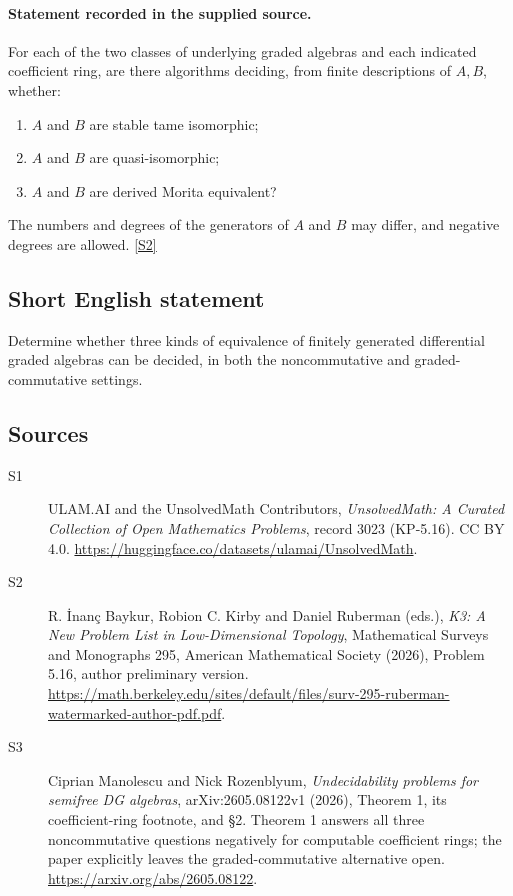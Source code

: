\documentclass[11pt]{article}
\newcommand{\sref}[2]{\hyperlink{source:#1:#2}{[S#2]}}
\begin{document}
\paragraph{Statement recorded in the supplied source.}
For each of the two classes of underlying graded algebras and each indicated coefficient ring, are there algorithms deciding, from finite descriptions of $A,B$, whether:
\begin{enumerate}
\item[(a)] $A$ and $B$ are stable tame isomorphic;
\item[(b)] $A$ and $B$ are quasi-isomorphic;
\item[(c)] $A$ and $B$ are derived Morita equivalent?
\end{enumerate}
The numbers and degrees of the generators of $A$ and $B$ may differ, and negative degrees are allowed. \sref{3023}{2}
\subsection{Short English statement}
Determine whether three kinds of equivalence of finitely generated differential graded algebras can be decided, in both the noncommutative and graded-commutative settings.
\subsection{Sources}
\begin{description}
\item[\hypertarget{source:3023:1}{S1}] ULAM.AI and the UnsolvedMath Contributors, \emph{UnsolvedMath: A Curated Collection of Open Mathematics Problems}, record 3023 (KP-5.16). CC BY 4.0. \url{https://huggingface.co/datasets/ulamai/UnsolvedMath}.
\item[\hypertarget{source:3023:2}{S2}] R. İnanç Baykur, Robion C. Kirby and Daniel Ruberman (eds.), \emph{K3: A New Problem List in Low-Dimensional Topology}, Mathematical Surveys and Monographs 295, American Mathematical Society (2026), Problem 5.16, author preliminary version. \url{https://math.berkeley.edu/sites/default/files/surv-295-ruberman-watermarked-author-pdf.pdf}.
\item[\hypertarget{source:3023:3}{S3}] Ciprian Manolescu and Nick Rozenblyum, \emph{Undecidability problems for semifree DG algebras}, arXiv:2605.08122v1 (2026), Theorem 1, its coefficient-ring footnote, and §2. Theorem 1 answers all three noncommutative questions negatively for computable coefficient rings; the paper explicitly leaves the graded-commutative alternative open. \url{https://arxiv.org/abs/2605.08122}.
\end{description}
\label{end:3023}
\end{document}
